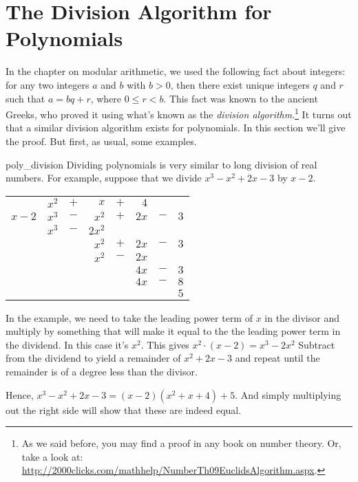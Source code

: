 \section{The Division Algorithm for Polynomials\quad
{}}
In the chapter on modular arithmetic, we used the following fact about integers: for any two integers $a$ and $b$  with $b > 0$, then there exist unique
integers $q$ and $r$ such that $a = bq+r$, where $0 \leq r < b$. This fact was known to the ancient Greeks, who proved it using what's known as the \emph{division algorithm}.\footnote{As we said before, you may find a proof in any book on number theory. Or, take a look at:  \url{http://2000clicks.com/mathhelp/NumberTh09EuclidsAlgorithm.aspx}.} It turns out that a similar
division algorithm exists for
polynomials. In this section we'll  give the proof. But first, as usual, some examples.

\begin{example}{poly_division} 
Dividing polynomials is very similar to long division of real numbers.  
 For example,
suppose that we divide $x^3 - x^2 + 2 x - 3$ by $x - 2$.  
\begin{center}
\begin{tabular}{rrcrcrcr}
        &  $x^2$  &  $+$  &      $x$  &  $+$  &    $4$  &       &       \\ \cline{2-8}
 \multicolumn{1}{r|}{$x - 2$}
        &  $x^3$  &  $-$  &    $x^2$  &  $+$  &  $2 x$  &  $-$  &  $3$  \\
        &  $x^3$  &  $-$  &  $2 x^2$  &       &         &       &       \\ \cline{2-8}
        &         &       &    $x^2$  &  $+$  &  $2 x$  &  $-$  &  $3$  \\
        &         &       &    $x^2$  &  $-$  &  $2 x$  &       &       \\ \cline{4-8}
        &         &       &           &       &  $4 x$  &  $-$  &  $3$  \\
        &         &       &           &       &  $4 x$  &  $-$  &  $8$  \\ \cline{6-8}
        &         &       &           &       &         &       &  $5$
\end{tabular}
\end{center}
In the example, we need to take the leading power term of $x$ in the divisor and multiply by something that will make it equal to the the leading power term in the dividend.  In this case it's $x^2$.  This gives $x^2\cdot(x-2) = x^3 - 2x^2$  Subtract from the dividend to yield a remainder of $x^2 + 2x - 3$ and repeat until the remainder is of a degree less than the divisor.
 
Hence, $x^3 - x^2 + 2 x - 3 = (x - 2) (x^2 + x + 4 ) + 5$.  And simply multiplying out the right side will show that these are indeed equal.
\end{example}

